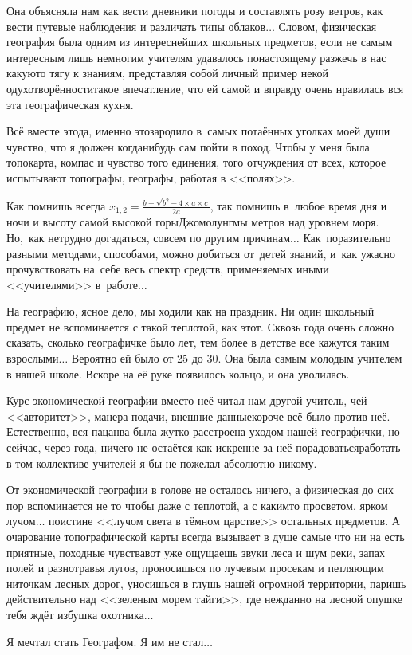 Она объясняла нам как вести дневники погоды и составлять розу ветров, как вести путевые наблюдения и различать типы облаков$\ldots$ Словом, физическая география была одним из интереснейших школьных предметов, если не самым интересным\mdash 
лишь немногим учителям удавалось по\sdash настоящему разжечь в нас какую\sdash то тягу к знаниям, представляя собой личный пример некой одухотворённости\mdash такое впечатление, что ей самой и вправду очень нравилась вся эта географическая кухня.

Всё вместе это\mdash да, именно это\mdash зародило в~самых потаённых уголках моей души чувство, что я должен когда\sdash нибудь сам пойти в поход. Чтобы у меня была топокарта, компас и чувство того единения, того отчуждения от всех, которое испытывают топографы, географы, работая в <<полях>>.
 
Как помнишь всегда ${x_{1,2}= \frac{b\pm \sqrt{b^2-4\times a\times c}}{2a}}$, так помнишь в~любое время дня и ночи и высоту самой высокой горы\mdash Джомолунгмы метров над уровнем моря. Но,~как нетрудно догадаться, совсем по другим причинам$\ldots$ Как~поразительно разными методами, способами, можно добиться от~детей знаний, и~как ужасно прочувствовать на~себе весь спектр средств, применяемых иными <<учителями>> в~работе$\ldots$ 

На географию, ясное дело, мы ходили как на праздник. Ни один школьный предмет не вспоминается с такой теплотой, как этот. Сквозь года очень сложно сказать, сколько географичке было лет, тем более в детстве все кажутся таким взрослыми$\ldots$ Вероятно ей было от 25 до 30. Она была самым молодым учителем в нашей школе. Вскоре на её руке появилось кольцо, и она уволилась. 

Курс экономической географии вместо неё читал нам другой учитель, чей <<авторитет>>, манера подачи, внешние данные\mdash короче всё было против неё. Естественно, вся пацанва была жутко расстроена уходом нашей географички, но сейчас, через года, ничего не остаётся как искренне за неё порадоваться\mdash работать в том коллективе учителей я бы не пожелал абсолютно никому. 

От экономической географии в голове не осталось ничего, а физическая до сих пор вспоминается не то чтобы даже с теплотой, а с каким\sdash то просветом, ярком лучом$\ldots$ поистине <<лучом света в тёмном царстве>> остальных предметов. А очарование топографической карты всегда вызывает в душе самые что ни на есть приятные, походные чувства\mdash вот уже ощущаешь звуки леса и шум реки, запах полей и разнотравья лугов, проносишься по лучевым просекам и петляющим ниточкам лесных дорог, уносишься в глушь нашей огромной территории, паришь действительно над <<зеленым морем тайги>>, где нежданно на лесной опушке тебя ждёт избушка охотника$\ldots$

Я мечтал стать Географом. Я им не стал$\ldots$

\begin{center}
\end{center}
